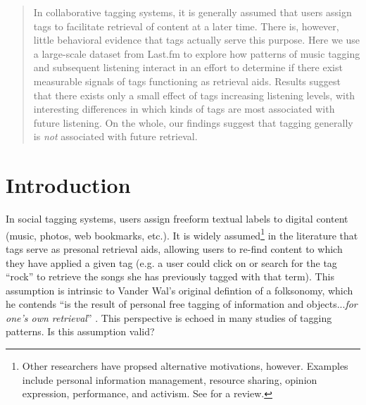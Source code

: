 \documentclass[preprint]{sig-alternate-2013}
\begin{document}
\maketitle

\begin{abstract}
In collaborative tagging systems, it is generally assumed that users assign tags to facilitate retrieval of content at a later time. There is, however, little behavioral evidence that tags actually serve this purpose. Here we use a large-scale dataset from Last.fm to explore how patterns of music tagging and subsequent listening interact in an effort to determine if there exist measurable signals of tags functioning as retrieval aids. Results suggest that there exists only a small effect of tags increasing listening levels, with interesting differences in which kinds of tags are most associated with future listening. On the whole, our findings suggest that tagging generally is \emph{not} associated with future retrieval.
\end{abstract}





\section{Introduction}
\label{sec:intro}
In social tagging systems, users assign freeform textual labels to digital content (music, photos, web bookmarks, etc.). It is widely assumed\footnote{Other researchers have propsed alternative motivations, however. Examples include personal information management, resource sharing, opinion expression, performance, and activism. See \cite{Gupta2010} for a review.} in the literature that tags serve as  presonal retrieval aids, allowing users to re-find content to which they have applied a given tag (e.g. a user could click on or search for the tag ``rock'' to retrieve the songs she has previously tagged with that term). This assumption is intrinsic to Vander Wal's original defintion of a folksonomy, which he contends ``is the result of personal free tagging of information and objects...\emph{for one's own retrieval}'' \cite[emphasis added]{VanderWal2007}. This perspective is echoed in many studies of tagging patterns. Is this assumption valid?
\end{document}
